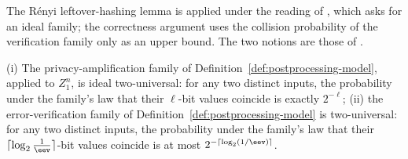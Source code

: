 
The R\'enyi leftover-hashing lemma \cite[Thm.~4]{kamin2025renyi} is applied
under the reading of \cite[Lemma~6.5 and Rem.~6.1]{tupkary2026decoy}, which
asks for an ideal family; the correctness argument uses the collision
probability of the verification family only as an upper bound. The two
notions are those of \cite[Def.~3.5]{tupkary2026decoy}.

\begin{assumption}\label{ass:hash}
(i) The privacy-amplification family of
Definition~\ref{def:postprocessing-model}, applied to $Z_1^n$, is ideal
two-universal: for any two distinct inputs, the probability under the
family's law that their $\ell$-bit values coincide is exactly $2^{-\ell}$;
(ii) the error-verification family of
Definition~\ref{def:postprocessing-model} is two-universal: for any two
distinct inputs, the probability under the family's law that their
$\lceil\log_2\frac1{\eev}\rceil$-bit values coincide is at most
$2^{-\lceil\log_2(1/\eev)\rceil}$.
\end{assumption}
